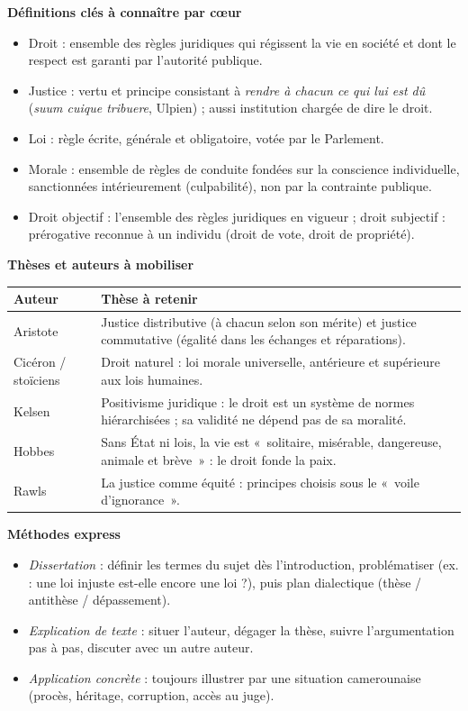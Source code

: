 \documentclass[11pt]{article}
\newcommand{\cle}[1]{{\popxbold\color{popdark}#1}}
\begin{document}
\begin{bilan}
\textbf{Définitions clés à connaître par cœur}
\begin{itemize}
  \item \cle{Droit} : ensemble des règles juridiques qui régissent la vie en société et dont le respect est garanti par l'autorité publique.
  \item \cle{Justice} : vertu et principe consistant à \emph{rendre à chacun ce qui lui est dû} (\emph{suum cuique tribuere}, Ulpien) ; aussi institution chargée de dire le droit.
  \item \cle{Loi} : règle écrite, générale et obligatoire, votée par le Parlement.
  \item \cle{Morale} : ensemble de règles de conduite fondées sur la conscience individuelle, sanctionnées intérieurement (culpabilité), non par la contrainte publique.
  \item \cle{Droit objectif} : l'ensemble des règles juridiques en vigueur ; \cle{droit subjectif} : prérogative reconnue à un individu (droit de vote, droit de propriété).
\end{itemize}

\textbf{Thèses et auteurs à mobiliser}
\begin{center}
\begin{tabularx}{\linewidth}{|l|X|}
\hline
\rowcolor{popblueL} \textbf{Auteur} & \textbf{Thèse à retenir} \\
\hline
Aristote & Justice distributive (à chacun selon son mérite) et justice commutative (égalité dans les échanges et réparations). \\
\hline
Cicéron / stoïciens & Droit naturel : loi morale universelle, antérieure et supérieure aux lois humaines. \\
\hline
Kelsen & Positivisme juridique : le droit est un système de normes hiérarchisées ; sa validité ne dépend pas de sa moralité. \\
\hline
Hobbes & Sans État ni lois, la vie est «~solitaire, misérable, dangereuse, animale et brève~» : le droit fonde la paix. \\
\hline
Rawls & La justice comme équité : principes choisis sous le «~voile d'ignorance~». \\
\hline
\end{tabularx}
\end{center}

\textbf{Méthodes express}
\begin{itemize}
  \item \emph{Dissertation} : définir les termes du sujet dès l'introduction, problématiser (ex. : une loi injuste est-elle encore une loi ?), puis plan dialectique (thèse / antithèse / dépassement).
  \item \emph{Explication de texte} : situer l'auteur, dégager la thèse, suivre l'argumentation pas à pas, discuter avec un autre auteur.
  \item \emph{Application concrète} : toujours illustrer par une situation camerounaise (procès, héritage, corruption, accès au juge).
\end{itemize}
\end{bilan}
\end{document}
